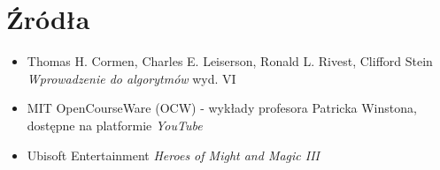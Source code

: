 \documentclass[13pt]{article}
\begin{document}
\section{Źródła}
\begin{itemize}
\item Thomas H. Cormen, Charles E. Leiserson, Ronald L. Rivest, Clifford Stein \textit{Wprowadzenie do algorytmów} wyd. VI
\item MIT OpenCourseWare (OCW) - wykłady profesora Patricka Winstona, dostępne na platformie \textit{YouTube}
\item Ubisoft Entertainment \textit{Heroes of Might and Magic III}
\end{itemize}
\end{document}
